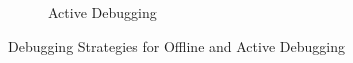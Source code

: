 \begin{figure}[h]
\begin{subfigure}[h]{0.75\textwidth}
		\caption{Active Debugging}
		\label{fig:active-debugging}
	\end{subfigure}
	\caption{Debugging Strategies for Offline and Active Debugging}
\end{figure}